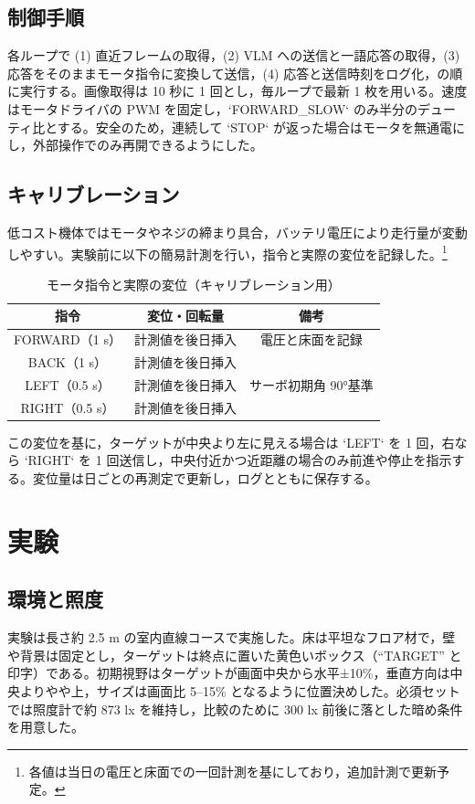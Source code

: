 \documentclass[a4paper,11pt]{ltjsreport}
\begin{document}
\section{制御手順}
各ループで (1) 直近フレームの取得，(2) VLM への送信と一語応答の取得，(3) 応答をそのままモータ指令に変換して送信，(4) 応答と送信時刻をログ化，の順に実行する。画像取得は 10 秒に 1 回とし，毎ループで最新 1 枚を用いる。速度はモータドライバの PWM を固定し，`FORWARD\_SLOW` のみ半分のデューティ比とする。安全のため，連続して `STOP` が返った場合はモータを無通電にし，外部操作でのみ再開できるようにした。

\section{キャリブレーション}
低コスト機体ではモータやネジの締まり具合，バッテリ電圧により走行量が変動しやすい。実験前に以下の簡易計測を行い，指令と実際の変位を記録した。\footnote{各値は当日の電圧と床面での一回計測を基にしており，追加計測で更新予定。}

\begin{table}[htbp]
  \centering
  \caption{モータ指令と実際の変位（キャリブレーション用）}
  \label{tab:calibration}
  \begin{tabular}{|c|c|c|}
    \hline
    指令 & 変位・回転量 & 備考 \\
    \hline
    FORWARD（1 s） & 計測値を後日挿入 & 電圧と床面を記録 \\
    BACK（1 s） & 計測値を後日挿入 &  \\
    LEFT（0.5 s） & 計測値を後日挿入 & サーボ初期角 90°基準 \\
    RIGHT（0.5 s） & 計測値を後日挿入 &  \\
    \hline
  \end{tabular}
\end{table}

この変位を基に，ターゲットが中央より左に見える場合は `LEFT` を 1 回，右なら `RIGHT` を 1 回送信し，中央付近かつ近距離の場合のみ前進や停止を指示する。変位量は日ごとの再測定で更新し，ログとともに保存する。

\chapter{実験}
\label{chap:experiments}

\section{環境と照度}
実験は長さ約 2.5 m の室内直線コースで実施した。床は平坦なフロア材で，壁や背景は固定とし，ターゲットは終点に置いた黄色いボックス（“TARGET” と印字）である。初期視野はターゲットが画面中央から水平±10\%，垂直方向は中央よりやや上，サイズは画面比 5--15\% となるように位置決めした。必須セットでは照度計で約 873 lx を維持し，比較のために 300 lx 前後に落とした暗め条件を用意した。
\end{document}
